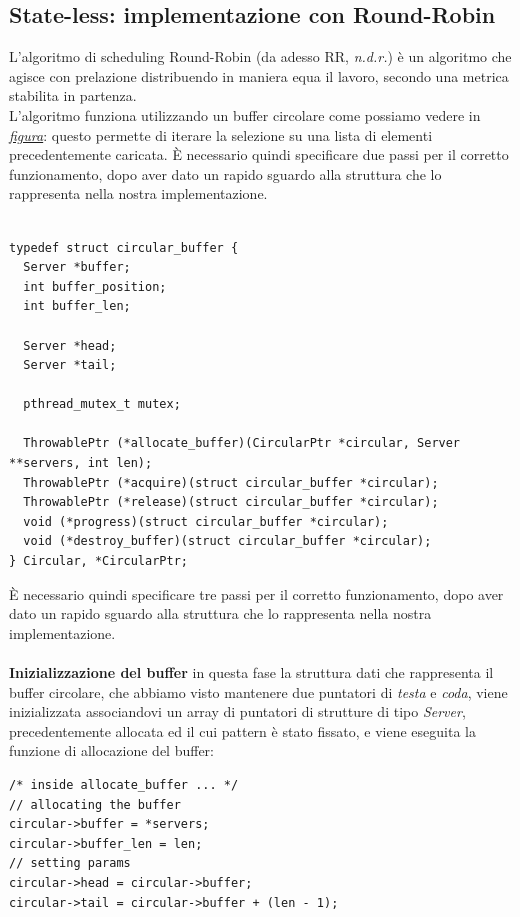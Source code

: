 \documentclass[italian]{tktltiki2}
\begin{document}
\subsection{State-less: implementazione con Round-Robin}
L'algoritmo di scheduling Round-Robin (da adesso RR, \emph{n.d.r.}) è un algoritmo che agisce con prelazione distribuendo in maniera equa il lavoro, secondo una metrica stabilita in partenza.
\\
L'algoritmo funziona utilizzando un buffer circolare come possiamo vedere in \hyperref[fig: rrobin_sl]{\emph{figura}}: questo permette di iterare la selezione su una lista di elementi precedentemente caricata. È necessario quindi specificare due passi per il corretto funzionamento, dopo aver dato un rapido sguardo alla struttura che lo rappresenta nella nostra implementazione.
\\
\\
\begin{lstlisting}
typedef struct circular_buffer {
  Server *buffer;
  int buffer_position;
  int buffer_len;
  
  Server *head;
  Server *tail;

  pthread_mutex_t mutex;

  ThrowablePtr (*allocate_buffer)(CircularPtr *circular, Server **servers, int len);
  ThrowablePtr (*acquire)(struct circular_buffer *circular);
  ThrowablePtr (*release)(struct circular_buffer *circular);
  void (*progress)(struct circular_buffer *circular);
  void (*destroy_buffer)(struct circular_buffer *circular);
} Circular, *CircularPtr;
\end{lstlisting}
\break
È necessario quindi specificare tre passi per il corretto funzionamento, dopo aver dato un rapido sguardo alla struttura che lo rappresenta nella nostra implementazione.
\\
\\
\textbf{Inizializzazione del buffer} in questa fase la struttura dati che rappresenta il buffer circolare, che abbiamo visto mantenere due puntatori di \emph{testa} e \emph{coda}, viene inizializzata associandovi un array di puntatori di strutture di tipo \emph{Server}, precedentemente allocata ed il cui pattern è stato fissato, e viene eseguita la funzione di allocazione del buffer: 
\begin{lstlisting}
/* inside allocate_buffer ... */
// allocating the buffer
circular->buffer = *servers;
circular->buffer_len = len;
// setting params
circular->head = circular->buffer;
circular->tail = circular->buffer + (len - 1);
\end{lstlisting}
\end{document}
